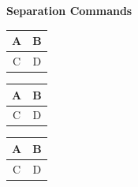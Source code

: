 \documentclass{article}
\begin{document}
	{\centering\Huge\bf Separation Commands}
	\setlength{\textfloatsep}{2.5cm}
	\begin{table}[t] %
		\begin{tabular}{|c|c|}
			\hline A & B \\ \hline C & D \\ \hline
		\end{tabular}
	\end{table}
	\setlength{\floatsep}{2cm}
	\begin{table}[t]
		\begin{tabular}{|c|c|}
			\hline A & B \\ \hline C & D \\ \hline
		\end{tabular}
	\end{table}
	
	\vspace{1cm}
	
	\setlength{\intextsep}{1.5cm}
	\kant[1]
	\begin{table}[h]
		\begin{tabular}{|c|c|}
			\hline A & B \\ \hline C & D \\ \hline
		\end{tabular}
	\end{table}
	\kant[1]
	
\end{document}
